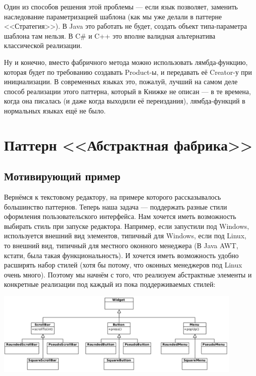 \documentclass{../../text-style}
\begin{document}
 Один из способов решения этой проблемы --- если язык позволяет, заменить наследование параметризацией шаблона (как мы уже делали в паттерне <<Стратегия>>). В Java это работать не будет, создать объект типа-параметра шаблона там нельзя. В C\# и C++ это вполне валидная альтернатива классической реализации.

 Ну и конечно, вместо фабричного метода можно использовать лямбда-функцию, которая будет по требованию создавать Product-ы, и передавать её Creator-у при инициализации. В современных языках это, пожалуй, лучший на самом деле способ реализации этого паттерна, который в Книжке не описан --- в те времена, когда она писалась (и даже когда выходили её переиздания), лямбда-функций в нормальных языках ещё не было.

\section{Паттерн <<Абстрактная фабрика>>}

\subsection{Мотивирующий пример}

Вернёмся к текстовому редактору, на примере которого рассказывалось большинство паттернов. Теперь наша задача --- поддержать разные стили оформления пользовательского интерфейса. Нам хочется иметь возможность выбирать стиль при запуске редактора. Например, если запустили под Windows, используется внешний вид элементов, типичный для Windows, если под Linux, то внешний вид, типичный для местного оконного менеджера (В Java AWT, кстати, была такая функциональность). И хочется иметь возможность удобно расширять набор стилей (хотя бы потому, что оконных менеджеров под Linux очень много). Поэтому мы начнём с того, что реализуем абстрактные элементы и конкретные реализации под каждый из пока поддерживаемых стилей:

\begin{center}
    \includegraphics[width=0.9\textwidth]{widgets.png}
\end{center}
\end{document}
